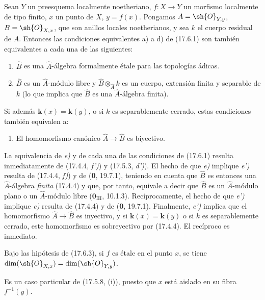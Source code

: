 \begin{proposition}[17.6.3]
\label{IV.17.6.3}
Sean $Y$ un preesquema \textup{localmente noetheriano}, $f:X\to Y$ un morfismo localmente de tipo finito, $x$ un punto de $X$, $y=f(x)$. Pongamos $A=\sh{O}_{Y,y}$, $B=\sh{O}_{X,x}$, que son anillos locales noetherianos, y sea $k$ el cuerpo residual de $A$. Entonces las condiciones equivalentes \textup{a)} a \textup{d)} de \textup{(17.6.1)} son también equivalentes a cada una de las siguientes:
\begin{enumerate}
  \item[\textup{e)}] $\widehat B$ es una $\widehat A$-álgebra formalmente étale para las topologías ádicas.
  \item[\textup{e$'$)}] $\widehat B$ es un $\widehat A$-módulo libre y $\widehat B\otimes_{\widehat A}k$ es un cuerpo, extensión finita y separable de $k$ \textup{(lo que implica que $\widehat B$ es una $\widehat A$-álgebra} finita\textup{)}.
\end{enumerate}
Si además $\boldsymbol{k}(x)=\boldsymbol{k}(y)$, o si $k$ es separablemente cerrado, estas condiciones también equivalen a:
\begin{enumerate}
  \item[\textup{e$''$)}] El homomorfismo canónico $\widehat A\to\widehat B$ es biyectivo.
\end{enumerate}
\end{proposition}

La equivalencia de \emph{e)} y de cada una de las condiciones de (17.6.1) resulta inmediatamente de (17.4.4, \emph{f')}) y (17.5.3, \emph{d')}). El hecho de que \emph{e)} implique \emph{e')} resulta de (17.4.4, \emph{f)}) y de (\textbf 0, 19.7.1), teniendo en cuenta que $\widehat B$ es entonces una $\widehat A$-álgebra \emph{finita} (17.4.4) y que, por tanto, equivale a decir que $\widehat B$ es un $\widehat A$-módulo plano o un $\widehat A$-módulo libre ($\mathbf{0}_{\mathrm{III}}$, 10.1.3). Recíprocamente, el hecho de que \emph{e')} implique \emph{e)} resulta de (17.4.4) y de (\textbf 0, 19.7.1). Finalmente, \emph{e')} implica que el homomorfismo $\widehat A\to\widehat B$ es inyectivo, y si $\boldsymbol{k}(x)=\boldsymbol{k}(y)$ o si $k$ es separablemente cerrado, este homomorfismo es sobreyectivo por (17.4.4). El recíproco es inmediato.

\begin{proposition}[17.6.4]
\label{IV.17.6.4}
Bajo las hipótesis de \textup{(17.6.3)}, si $f$ es étale en el punto $x$, se tiene $\dim(\sh{O}_{X,x})=\dim(\sh{O}_{Y,y})$.
\end{proposition}

Es un caso particular de (17.5.8, (i)), puesto que $x$ está aislado en su fibra $f^{-1}(y)$.

